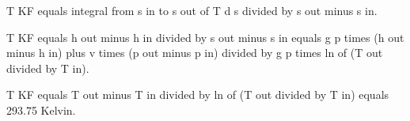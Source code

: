 T KF equals integral from s in to s out of T d s divided by s out minus s in.  

T KF equals h out minus h in divided by s out minus s in equals g p times (h out minus h in) plus v times (p out minus p in) divided by g p times ln of (T out divided by T in).  

T KF equals T out minus T in divided by ln of (T out divided by T in) equals 293.75 Kelvin.